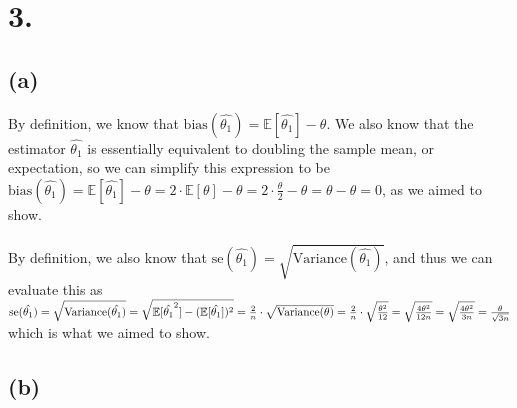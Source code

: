 \documentclass{article}
\begin{document}
\section*{3.}
{\Large

\subsection*{(a)}

By definition, we know that $\text{bias}(\hat{\theta_1}) = \mathbb{E}[\hat{\theta_1}] - \theta$. We also know that the estimator $\hat{\theta_1}$ is essentially equivalent to doubling the sample mean, or expectation, so we can simplify this expression to be \\
$\text{bias}(\hat{\theta_1}) = \mathbb{E}[\hat{\theta_1}] - \theta = 2 \cdot \mathbb{E}[\theta] - \theta = 2 \cdot \frac{\theta}{2} - \theta = \theta - \theta = 0$, as we aimed to show. \\ \\
By definition, we also know that $\text{se}(\hat{\theta_1}) = \sqrt{\text{Variance}(\hat{\theta_1})}$, and thus we can evaluate this as \\ 
$\text{se}(\hat{\theta_1}) 
= \sqrt{\text{Variance}(\hat{\theta_1})} \\
= \sqrt{\mathbb{E}[\hat{\theta_1}^2] - (\mathbb{E}[\hat{\theta_1}])^2} \\
= \frac{2}{n} \cdot \sqrt{\text{Variance}(\theta)} \\
= \frac{2}{n} \cdot \sqrt{\frac{\theta^2}{12}} \\
= \sqrt{\frac{4\theta^2}{12n}}
= \sqrt{\frac{4\theta^2}{3n}} 
= \frac{\theta}{\sqrt{3n}}$ \\
which is what we aimed to show.

\subsection*{(b)}

}
\end{document}
